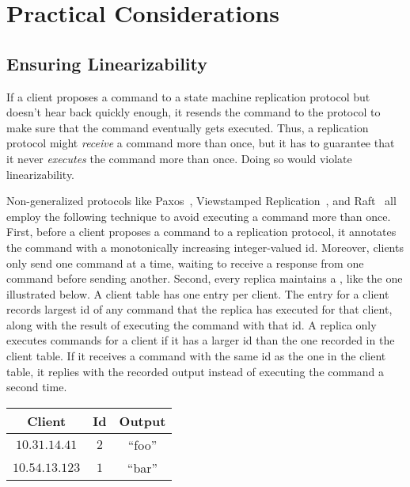 \section{Practical Considerations}

\subsection{Ensuring Linearizability}
If a client proposes a command to a state machine replication protocol but
doesn't hear back quickly enough, it resends the command to the protocol to
make sure that the command eventually gets executed. Thus, a replication
protocol might \emph{receive} a command more than once, but it has to guarantee
that it never \emph{executes} the command more than once. Doing so would
violate linearizability.

Non-generalized protocols like Paxos~\cite{van2015paxos}, Viewstamped
Replication~\cite{liskov2012viewstamped}, and Raft~\cite{ongaro2014search} all
employ the following technique to avoid executing a command more than once.
First, before a client proposes a command to a replication protocol, it
annotates the command with a monotonically increasing integer-valued id.
Moreover, clients only send one command at a time, waiting to receive a
response from one command before sending another. Second, every replica
maintains a , like the one illustrated below. A client
table has one entry per client. The entry for a client records largest id of
any command that the replica has executed for that client, along with the
result of executing the command with that id. A replica only executes commands
for a client if it has a larger id than the one recorded in the client table.
If it receives a command with the same id as the one in the client table, it
replies with the recorded output instead of executing the command a second
time.

\begin{center}
  \begin{tabular}{|c|c|c|}
    \hline
    \textbf{Client} & \textbf{Id} & \textbf{Output} \\\hline
    $10.31.14.41$   & $2$         & ``foo'' \\
    $10.54.13.123$  & $1$         & ``bar'' \\\hline
  \end{tabular}
\end{center}

